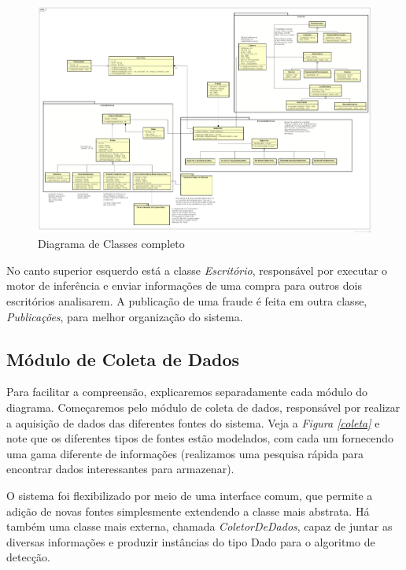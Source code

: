 \documentclass[a4paper,10pt]{article}
\begin{document}
\begin{figure}[ht]
  \centering
  \includegraphics[width=1.2\textwidth, keepaspectratio=true]{images/classes.png}
  \caption {Diagrama de Classes completo}
  \label {dc}
\end{figure}

No canto superior esquerdo está a classe \emph{Escritório}, responsável por executar
o motor de inferência e enviar informações de uma compra para outros dois
escritórios analisarem. A publicação de uma fraude é feita em outra classe,
\emph{Publicações}, para melhor organização do sistema.

\subsection{Módulo de Coleta de Dados}

Para facilitar a compreensão, explicaremos separadamente cada módulo do diagrama.
Começaremos pelo módulo de coleta de dados, responsável por realizar a aquisição de
dados das diferentes fontes do sistema. Veja a \emph{Figura \ref{coleta}} e note que
os diferentes tipos de fontes estão modelados, com cada um fornecendo uma gama
diferente de informações (realizamos uma pesquisa rápida para encontrar dados
interessantes para armazenar). \par

O sistema foi flexibilizado por meio de uma interface comum, que permite a adição de
novas fontes simplesmente extendendo a classe mais abstrata. Há também uma classe
mais externa, chamada \emph{ColetorDeDados}, capaz de juntar as diversas informações e
produzir instâncias do tipo Dado para o algoritmo de detecção.
\end{document}
